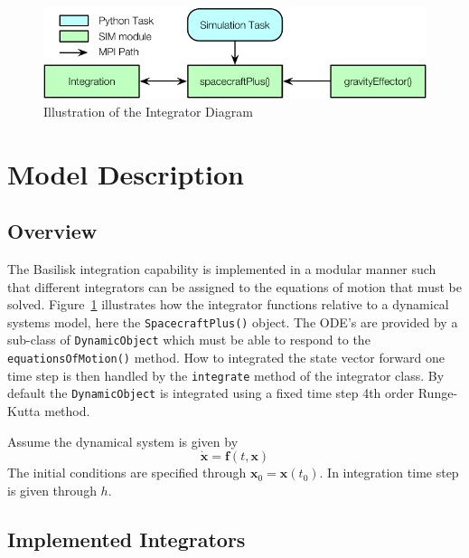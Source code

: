 \begin{figure}[htb]
	\centerline{
	\includegraphics[]{Figures/integratorDiagram}
	}
	\caption{Illustration of the Integrator Diagram}
	\label{fig:intDiag}
\end{figure}


\section{Model Description}

\subsection{Overview}
The Basilisk integration capability is implemented in a modular manner such that different integrators can be assigned to the equations of motion that must be solved.  Figure~\ref{fig:intDiag} illustrates how the integrator functions relative to a dynamical systems model, here the {\tt SpacecraftPlus()} object.  The ODE's are provided by a sub-class of {\tt DynamicObject} which must be able to respond to the {\tt equationsOfMotion()} method.  How to integrated the state vector forward one time step is then handled by the {\tt integrate} method of the integrator class.  By default the {\tt DynamicObject} is integrated using a fixed time step 4th order Runge-Kutta method.  

Assume the dynamical system is given by
\begin{equation}
	\dot{\bm x} = \bm f(t, \bm x)
\end{equation}
The initial conditions are specified through $\bm x_{0} = \bm x(t_{0})$.  In integration time step is given through $h$.  

\subsection{Implemented Integrators}

